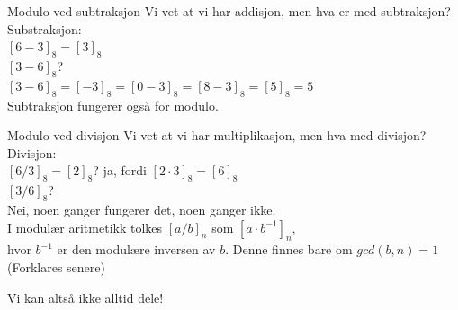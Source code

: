 \begin{frame}[fragile]{Modulo ved subtraksjon}
    Vi vet at vi har addisjon, men hva er med subtraksjon?\\

    Substraksjon:\\
    $[6-3]_8=[3]_8$\\
    $[3-6]_8$?\\
    \pause
    $[3-6]_8=[-3]_8=[0-3]_8=[8-3]_8=[5]_8=5$\\

    Subtraksjon fungerer også for modulo.  
\end{frame}

\begin{frame}{Modulo ved divisjon}
    Vi vet at vi har multiplikasjon, men hva med divisjon?\\

    Divisjon:\\
    $[6/3]_8=[2]_8$? \pause ja, fordi $[2\cdot 3]_8=[6]_8$\\
    $[3/6]_8$?\\
    \pause
    Nei, noen ganger fungerer det, noen ganger ikke. \\
    I modulær aritmetikk tolkes $[a/b]_n$ som $[a \cdot b^{-1}]_n$,\\
    hvor $b^{-1}$ er den modulære inversen av $b$. Denne finnes bare om $gcd(b,n)=1$ (Forklares senere)

    Vi kan altså ikke alltid dele!
\end{frame}